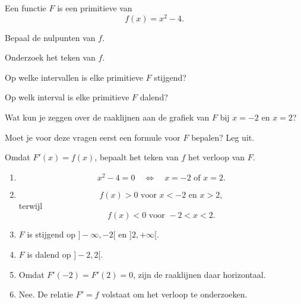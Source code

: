 \documentclass{ximera}
\begin{document}

\begin{oefening}{\oefU\ESS}

Een functie $F$ is een primitieve van
\[
f(x)=x^2-4.
\]

\begin{question}
Bepaal de nulpunten van $f$.
\end{question}

\begin{question}
Onderzoek het teken van $f$.
\end{question}

\begin{question}
Op welke intervallen is elke primitieve $F$ stijgend?
\end{question}

\begin{question}
Op welk interval is elke primitieve $F$ dalend?
\end{question}

\begin{question}
Wat kun je zeggen over de raaklijnen aan de grafiek van $F$ bij $x=-2$ en $x=2$?
\end{question}

\begin{question}
Moet je voor deze vragen eerst een formule voor $F$ bepalen? Leg uit.
\end{question}

\begin{oplossing}

Omdat $F'(x)=f(x)$, bepaalt het teken van $f$ het verloop van $F$.

\begin{enumerate}
\item
\[
x^2-4=0
\quad\Longleftrightarrow\quad
x=-2\text{ of }x=2.
\]

\item
\[
f(x)>0 \text{ voor }x<-2\text{ en }x>2,
\]
terwijl
\[
f(x)<0 \text{ voor }-2<x<2.
\]

\item $F$ is stijgend op $]-\infty,-2[$ en $]2,+\infty[$.
\item $F$ is dalend op $]-2,2[$.
\item Omdat $F'(-2)=F'(2)=0$, zijn de raaklijnen daar horizontaal.
\item Nee. De relatie $F'=f$ volstaat om het verloop te onderzoeken.
\end{enumerate}

\end{oplossing}

\end{oefening}
\end{document}
